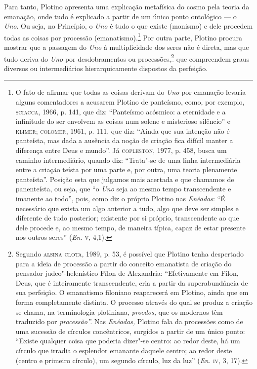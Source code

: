 Para tanto, Plotino apresenta uma explicação metafísica do cosmo
pela teoria da emanação, onde tudo é explicado a partir de um
único ponto ontológico --- o \emph{Uno}. Ou seja, no Princípio,
o \emph{Uno} é tudo o que existe (monismo) e dele procedem
todas as coisas por processão (emanatismo).\footnote{ O fato de
afirmar que todas as coisas derivam do \emph{Uno} por emanação
levaria alguns comentadores a acusarem Plotino de panteísmo,
como, por exemplo, \textsc{sciacca}, 1966, p. 141, que diz: “Panteísmo
acósmico: a eternidade e a infinitude do ser envolvem as coisas
num solene e misterioso silêncio” e \textsc{klimer}; \textsc{colomer}, 1961, p.
111, que diz: “Ainda que sua intenção não é panteísta, mas dada
a ausência da noção de criação fica  difícil manter  a diferença
entre Deus e mundo”. Já \textsc{copleston}, 1977, p. 458, busca um
caminho intermediário, quando diz: “Trata"-se de uma linha
intermediária entre a criação teísta por uma parte e, por outra,
uma teoria plenamente panteísta”. Posição esta que julgamos mais
acertada e que chamamos de panenteísta, ou seja, que “o
\emph{Uno} seja ao mesmo tempo transcendente e imanente ao
todo”, pois, como diz o próprio Plotino nas \emph{Enéadas}: “É
necessário que exista um algo anterior a tudo, algo que deve ser
simples e diferente de tudo posterior; existente por si próprio,
transcendente ao que dele procede e, ao mesmo tempo, de maneira
típica, capaz de estar presente nos outros seres” (\emph{En.}
\textsc{v}, 4,1).}  Por outra parte, Plotino procura mostrar que a passagem
do \emph{Uno}  à multiplicidade dos seres não é direta, mas
que tudo deriva do \emph{Uno} por desdobramentos ou
processões,\footnote{ Segundo \textsc{alsina} \textsc{clota}, 1989, p. 53, é
possível que Plotino tenha despertado para a ideia de processão
a partir do conceito emanatista de criação do pensador
judeo"-helenístico Fílon de Alexandria: “Efetivamente em Fílon,
Deus, que é inteiramente transcendente, cria a partir da
superabundância de sua perfeição. O emanatismo filoniano
reaparecerá em Plotino, ainda que em forma completamente
distinta. O processo através do qual se produz a criação se
chama, na terminologia plotiniana, \emph{proodos,} que os
modernos têm traduzido por \emph{processão”.} Nas\emph{
Enéadas,} Plotino fala da processões como de uma sucessão de
círculos concêntricos, surgidos a partir de um único ponto:
“Existe qualquer coisa que poderia dizer"-se centro: ao redor
deste, há um círculo que irradia o esplendor emanante daquele
centro; ao redor deste (centro e primeiro círculo), um segundo
círculo, luz da luz” (\emph{En.} \textsc{iv}, 3, 17).} que
compreendem graus diversos ou intermediários hierarquicamente
dispostos da perfeição. 


